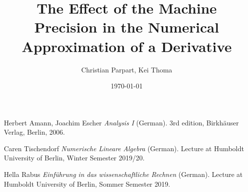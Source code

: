 \documentclass[a4paper,12pt]{scrartcl}
\title{The Effect of the Machine Precision in the Numerical Approximation of a Derivative}
\author{Christian Parpart, Kei Thoma}
\date{\today}
\begin{document}
\maketitle
\tableofcontents







\begin{thebibliography}{2}

Herbert Amann, Joachim Escher
\textit{Analysis I} (German). 
3rd edition, Birkh{\"a}user Verlag, Berlin, 2006.

Caren Tischendorf
\textit{Numerische Lineare Algebra} (German).
Lecture at Humboldt University of Berlin, Winter Semester 2019/20.

Hella Rabus
\textit{Einf{\"u}hrung in das wissenschaftliche Rechnen} (German).
Lecture at Humboldt University of Berlin, Sommer Semester 2019.

\end{thebibliography}
\end{document}
